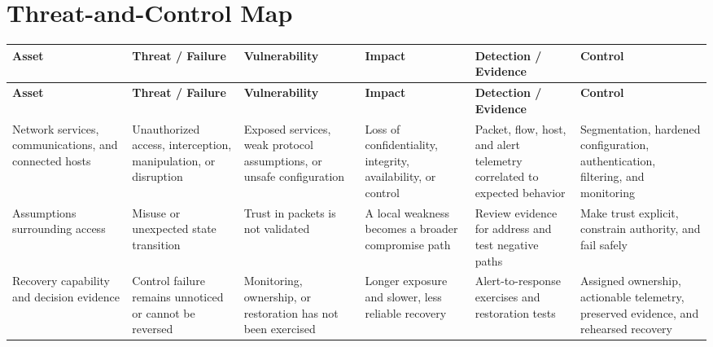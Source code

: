 \documentclass[11pt,letterpaper]{article}
\begin{document}
\section*{Threat-and-Control Map}
\begingroup\scriptsize\setlength{\tabcolsep}{2pt}
\begin{longtable}{>{\raggedright\arraybackslash}p{}>{\raggedright\arraybackslash}p{}>{\raggedright\arraybackslash}p{}>{\raggedright\arraybackslash}p{}>{\raggedright\arraybackslash}p{}>{\raggedright\arraybackslash}p{}}
\toprule\rowcolor{Navy}\color{white}\textbf{Asset} & \color{white}\textbf{Threat / Failure} & \color{white}\textbf{Vulnerability} & \color{white}\textbf{Impact} & \color{white}\textbf{Detection / Evidence} & \color{white}\textbf{Control}\\\midrule
\endfirsthead
\toprule\rowcolor{Navy}\color{white}\textbf{Asset} & \color{white}\textbf{Threat / Failure} & \color{white}\textbf{Vulnerability} & \color{white}\textbf{Impact} & \color{white}\textbf{Detection / Evidence} & \color{white}\textbf{Control}\\\midrule
\endhead
Network services, communications, and connected hosts & Unauthorized access, interception, manipulation, or disruption & Exposed services, weak protocol assumptions, or unsafe configuration & Loss of confidentiality, integrity, availability, or control & Packet, flow, host, and alert telemetry correlated to expected behavior & Segmentation, hardened configuration, authentication, filtering, and monitoring\\\midrule
Assumptions surrounding access & Misuse or unexpected state transition & Trust in packets is not validated & A local weakness becomes a broader compromise path & Review evidence for address and test negative paths & Make trust explicit, constrain authority, and fail safely\\\midrule
Recovery capability and decision evidence & Control failure remains unnoticed or cannot be reversed & Monitoring, ownership, or restoration has not been exercised & Longer exposure and slower, less reliable recovery & Alert-to-response exercises and restoration tests & Assigned ownership, actionable telemetry, preserved evidence, and rehearsed recovery\\\midrule
\bottomrule
\end{longtable}
\endgroup
\end{document}

